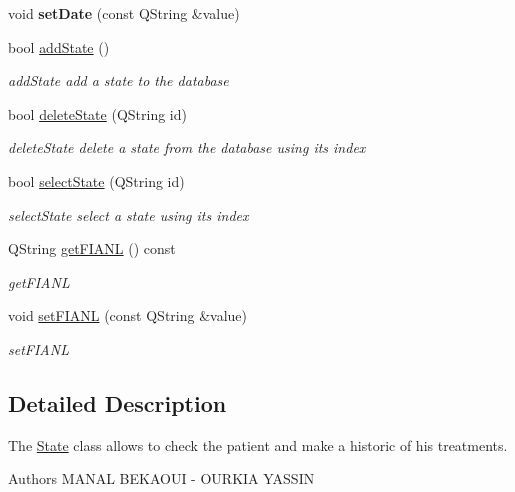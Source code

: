 \begin{DoxyCompactItemize}
\mbox{\label{class_state_a04e8a4f0f1574f7fba482971b48779ed}} 
void {\bfseries set\+Date} (const Q\+String \&value)
\item 
bool \mbox{\hyperlink{class_state_a51330e1a9e02a0e086d1627f4b488242}{add\+State}} ()
\begin{DoxyCompactList}\small\item\em add\+State add a state to the database \end{DoxyCompactList}\item 
bool \mbox{\hyperlink{class_state_a0cde655ef90979c58d0d4a10af13680c}{delete\+State}} (Q\+String id)
\begin{DoxyCompactList}\small\item\em delete\+State delete a state from the database using its index \end{DoxyCompactList}\item 
bool \mbox{\hyperlink{class_state_aa5ebecfef389f53f99341ccb5df8de35}{select\+State}} (Q\+String id)
\begin{DoxyCompactList}\small\item\em select\+State select a state using its index \end{DoxyCompactList}\item 
Q\+String \mbox{\hyperlink{class_state_a5b4cc8d273139472dead50c12c3aef3f}{get\+F\+I\+A\+NL}} () const
\begin{DoxyCompactList}\small\item\em get\+F\+I\+A\+NL \end{DoxyCompactList}\item 
void \mbox{\hyperlink{class_state_a335a98030204aa203a3bbe69cf3d8ed6}{set\+F\+I\+A\+NL}} (const Q\+String \&value)
\begin{DoxyCompactList}\small\item\em set\+F\+I\+A\+NL \end{DoxyCompactList}\end{DoxyCompactItemize}


\subsection{Detailed Description}
The \mbox{\hyperlink{class_state}{State}} class allows to check the patient and make a historic of his treatments. 

\begin{DoxyAuthor}{Authors}
M\+A\+N\+AL B\+E\+K\+A\+O\+UI -\/ O\+U\+R\+K\+IA Y\+A\+S\+S\+IN 
\end{DoxyAuthor}


